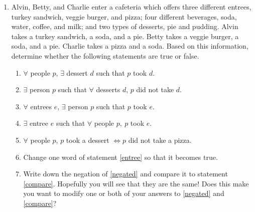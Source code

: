 \begin{enumerate}
\wbvfill

\workbookpagebreak

\item  Alvin, Betty, and Charlie enter a cafeteria which offers three different
entrees, turkey sandwich, veggie burger, and pizza; four different
beverages, soda, water, coffee, and milk; and two types of desserts,
pie and pudding. Alvin takes a turkey sandwich, a soda, and a pie.
Betty takes a veggie burger, a soda, and a pie. Charlie takes a pizza
and a soda. Based on this information, determine whether the following
statements are true or false.

\begin{enumerate}
\item \label{negated} \wbitemsep $\forall$ people $p$, $\exists$ dessert $d$ such that $ p$
took $d$. 
\item \label{compare} \wbitemsep $\exists$ person $p$ such that $\forall$ desserts
$d$, $p$ did not take $d$. 
\item \wbitemsep $\forall$ entrees $e$, $\exists$ person $p$ such that $ p$ took
$e$. 
\item \label{entree} \wbitemsep $\exists$ entree $e$ such that  $\forall$ people
$p,\ p$ took $e$. 
\item \wbitemsep $\forall$ people $p$, $p$ took a dessert $\iff p$ did not take
a pizza. 
\item \wbitemsep Change one word of statement \ref{entree} so that it becomes true. 
\item \wbitemsep Write down the negation of \ref{negated} and compare it to statement
\ref{compare}. Hopefully you will see that they are the same! Does
this make you want to modify one or both of your answers to \ref{negated}
and \ref{compare}? 
\end{enumerate}

\end{enumerate}
